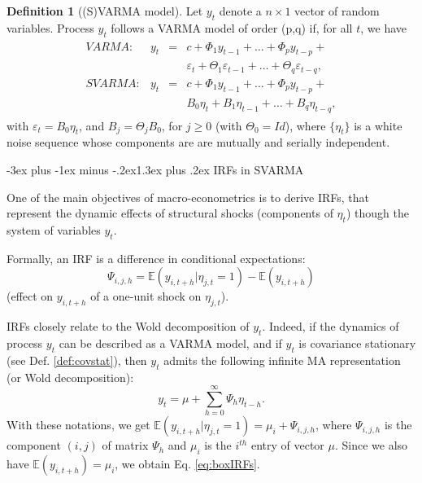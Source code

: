 \documentclass[
  11pt,
]{book}
\makeatletter
\renewcommand\section{\@startsection{section}{1}{\z@}
  {-3ex plus -1ex minus -.2ex}{1.3ex plus .2ex}
  {\normalfont\Large\bfseries\color{TextbookInk}}}
\theoremstyle{definition}
\newtheorem{definition}{Definition}[chapter]
\theoremstyle{definition}
\theoremstyle{definition}
\theoremstyle{definition}
\theoremstyle{remark}
\makeatother
\begin{document}
\begin{definition}[(S)VARMA model]
\protect\hypertarget{def:SVARMA}{}\label{def:SVARMA}Let \(y_{t}\) denote a \(n \times1\) vector of random variables. Process \(y_{t}\) follows a VARMA model of order (p,q) if, for all \(t\), we have
\begin{eqnarray}
\begin{array}{rllll}
VARMA:& y_t &=& c + \Phi_1 y_{t-1} + \dots + \Phi_p y_{t-p} + \\
&&&\varepsilon_t + \Theta_1\varepsilon_{t-1} + \dots + \Theta_q \varepsilon_{t-q},\\
SVARMA:& y_t &=& c + \Phi_1 y_{t-1} + \dots + \Phi_p y_{t-p} + \\
&&& B_0 \eta_t+ B_1 \eta_{t-1} + \dots +  B_q \eta_{t-q},
\end{array}\label{eq:yVARMA}
\end{eqnarray}
with \(\varepsilon_t = B_0\eta_t\), and \(B_j = \Theta_j B_0\), for \(j \ge 0\) (with \(\Theta_0 = Id\)), where \(\{\eta_{t}\}\) is a white noise sequence whose components are are mutually and serially independent.
\end{definition}

\section{IRFs in SVARMA}\label{IRFSVARMA}

One of the main objectives of macro-econometrics is to derive IRFs, that represent the dynamic effects of structural shocks (components of \(\eta_t\)) though the system of variables \(y_t\).

Formally, an IRF is a difference in conditional expectations:
\begin{equation}
\boxed{\Psi_{i,j,h} = \mathbb{E}(y_{i,t+h}|\eta_{j,t}=1) - \mathbb{E}(y_{i,t+h})}\label{eq:boxIRFs}
\end{equation}
(effect on \(y_{i,t+h}\) of a one-unit shock on \(\eta_{j,t}\)).

IRFs closely relate to the Wold decomposition of \(y_t\). Indeed, if the dynamics of process \(y_t\) can be described as a VARMA model, and if \(y_t\) is covariance stationary (see Def. \ref{def:covstat}), then \(y_t\) admits the following infinite MA representation (or Wold decomposition):
\begin{equation}
y_t = \mu + \sum_{h=0}^\infty \Psi_{h} \eta_{t-h}.\label{eq:InfMA}
\end{equation}
With these notations, we get \(\mathbb{E}(y_{i,t+h}|\eta_{j,t}=1) = \mu_i + \Psi_{i,j,h}\), where \(\Psi_{i,j,h}\) is the component \((i,j)\) of matrix \(\Psi_h\) and \(\mu_i\) is the \(i^{th}\) entry of vector \(\mu\). Since we also have \(\mathbb{E}(y_{i,t+h})=\mu_i\), we obtain Eq. \eqref{eq:boxIRFs}.
\end{document}
